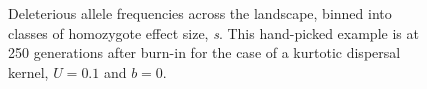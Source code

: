 \begin{figure}[h]
\centering
{}
\caption[Deleterious allele frequencies across the landscape.]{Deleterious allele frequencies across the landscape, binned into classes of homozygote effect size, \emph{s}. This hand-picked example is at 250 generations after burn-in for the case of a kurtotic dispersal kernel, $U = 0.1$ and $b = 0$.}
\label{fig:allfreqs}
\end{figure}





